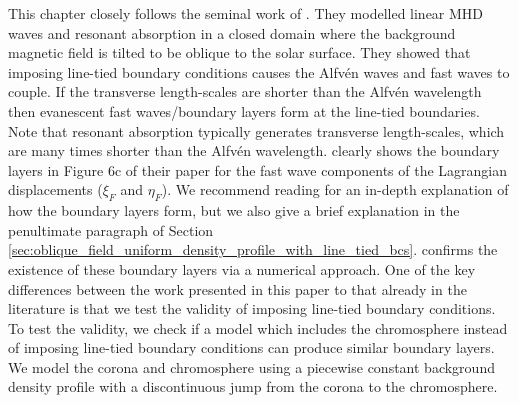 
This chapter closely follows the seminal work of \citet{Halberstadt1993,Goedbloed1994,Halberstadt1995}. They modelled linear MHD waves and resonant absorption in a closed domain where the background magnetic field is tilted to be oblique to the solar surface. They showed that imposing line-tied boundary conditions causes the Alfv\'en waves and fast waves to couple. If the transverse length-scales are shorter than the Alfv\'en wavelength then evanescent fast waves/boundary layers form at the line-tied boundaries. Note that resonant absorption typically generates transverse length-scales, which are many times shorter than the Alfv\'en wavelength. \citet{Goedbloed1994} clearly shows the boundary layers in Figure 6c of their paper for the fast wave components of the Lagrangian displacements ($\xi_F$ and $\eta_F$). We recommend reading \citet{Goedbloed1994} for an in-depth explanation of how the boundary layers form, but we also give a brief explanation in the penultimate paragraph of Section \ref{sec:oblique_field_uniform_density_profile_with_line_tied_bcs}. \citet{Arregui2003} confirms the existence of these boundary layers via a numerical approach. One of the key differences between the work presented in this paper to that already in the literature is that we test the validity of imposing line-tied boundary conditions. To test the validity, we check if a model which includes the chromosphere instead of imposing line-tied boundary conditions can produce similar boundary layers. We model the corona and chromosphere using a piecewise constant background density profile with a discontinuous jump from the corona to the chromosphere.

